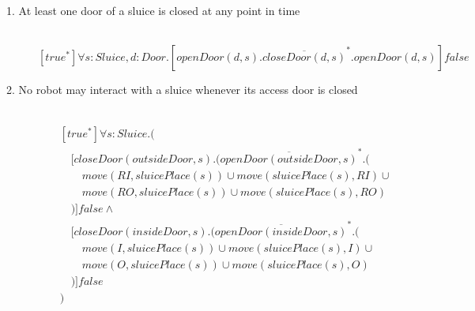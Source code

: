 
\newcommand{\tab}{\hspace{1em}}

\begin{description}
 \item[1. At least one door of a sluice is closed at any point in time]\mbox{}\\
\[
[true^*]\forall s:Sluice,d:Door.[openDoor(d, s).\overline{closeDoor(d, s)}^*.openDoor(d, s)]false
\]


 \item[2. No robot may interact with a sluice whenever its access door is closed]\mbox{}\\
\begin{align*}
& [true^*]\forall s:Sluice.( \\
& \tab [closeDoor(outsideDoor, s).(\overline{openDoor(outsideDoor, s)}^*.( \\
& \tab\tab move(RI, sluicePlace(s)) \cup move(sluicePlace(s), RI) \cup \\
& \tab\tab move(RO, sluicePlace(s)) \cup move(sluicePlace(s), RO) \\
& \tab )]false \wedge \\
& \tab [closeDoor(insideDoor, s).(\overline{openDoor(insideDoor, s)}^*.( \\
& \tab\tab move(I, sluicePlace(s)) \cup move(sluicePlace(s), I) \cup \\
& \tab\tab move(O, sluicePlace(s)) \cup move(sluicePlace(s), O) \\
& \tab )]false \\
& )
\end{align*}
 
 \item[]
 

\end{description}
